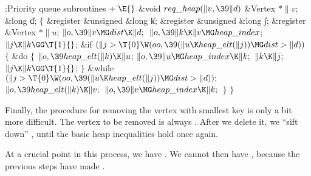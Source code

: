 \Y\B\4:Priority queue subroutines\X${}\mathrel+\E{}$\6
\1\1\&{void} ${}\\{req\_heap}(\|v,\39\|d){}$\6
\&{Vertex} ${}{*}\|v{}$;\6
\&{long} \|d;\2\2\6
${}\{{}$\5
\1\&{register} \&{unsigned} \&{long} \|k;\6
\&{register} \&{unsigned} \&{long} \|j;\6
\&{register} \&{Vertex} ${}{*}\|u{}$;\7
${}\|o,\39\|v\MG\\{dist}\K\|d;{}$\6
${}\|o,\39\|k\K\|v\MG\\{heap\_index}{}$;\6
${}\|j\K\|k\GG\T{1}{}$;\6
\&{if} ${}(\|j>\T{0}\W(\\{oo},\39(\|u\K\\{heap\_elt}(\|j))\MG\\{dist}>\|d)){}$\5
${}\{{}$\1\6
\&{do}\5
${}\{{}$\1\6
${}\|o,\39\\{heap\_elt}(\|k)\K\|u{}$;\6
${}\|o,\39\|u\MG\\{heap\_index}\K\|k;{}$\6
${}\|k\K\|j;{}$\6
${}\|j\K\|k\GG\T{1}{}$;\6
\4${}\}{}$\5
\2\5
\&{while} ${}(\|j>\T{0}\W(\\{oo},\39(\|u\K\\{heap\_elt}(\|j))\MG\\{dist}>%
\|d));{}$\6
${}\|o,\39\\{heap\_elt}(\|k)\K\|v;{}$\6
${}\|o,\39\|v\MG\\{heap\_index}\K\|k;{}$\6
\4${}\}{}$\2\6
\4${}\}{}$\2\par
\fi

Finally, the procedure for removing the vertex with smallest key is
only a bit more difficult. The vertex to be removed is always
. After we delete it, we ``sift down'' ,
until the basic heap inequalities hold once again.

At a crucial point in this process, we have . We cannot
then have
, because the previous steps have made .

